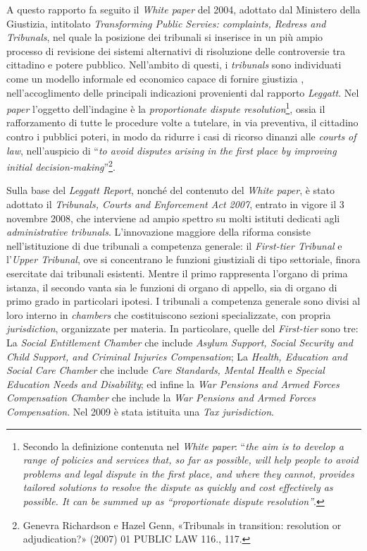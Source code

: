 \documentclass[12pt,it,a4paper,]{report}
\begin{document}
A questo rapporto fa seguito il \emph{White paper} del 2004, adottato
dal Ministero della Giustizia, intitolato \emph{Transforming Public
Servies: complaints, Redress and Tribunals}, nel quale la posizione dei
tribunali si inserisce in un più ampio processo di revisione dei sistemi
alternativi di risoluzione delle controversie tra cittadino e potere
pubblico. Nell'ambito di questi, i \emph{tribunals} sono individuati
come un modello informale ed economico capace di fornire giustizia ,
nell'accoglimento delle principali indicazioni provenienti dal rapporto
\emph{Leggatt}. Nel \emph{paper} l'oggetto dell'indagine è la
\emph{proportionate dispute resolution}\footnote{Secondo la definizione
  contenuta nel \emph{White paper}: ``\emph{the aim is to develop a
  range of policies and services that, so far as possible, will help
  people to avoid problems and legal dispute in the first place, and
  where they cannot, provides tailored solutions to resolve the dispute
  as quickly and cost effectively as possible. It can be summed up as
  ``proportionate dispute resolution''}.}, ossia il rafforzamento di
tutte le procedure volte a tutelare, in via preventiva, il cittadino
contro i pubblici poteri, in modo da ridurre i casi di ricorso dinanzi
alle \emph{courts of law}, nell'auspicio di ``\emph{to avoid disputes
arising in the first place by improving initial
decision-making}''\footnote{{Genevra Richardson e Hazel Genn,
  {«Tribunals in transition: resolution or adjudication?»} (2007) 01
  PUBLIC LAW 116.}, 117.}.

Sulla base del \emph{Leggatt Report}, nonché del contenuto del
\emph{White paper}, è stato adottato il \emph{Tribunals, Courts and
Enforcement Act 2007}, entrato in vigore il 3 novembre 2008, che
interviene ad ampio spettro su molti istituti dedicati agli
\emph{administrative tribunals}. L'innovazione maggiore della riforma
consiste nell'istituzione di due tribunali a competenza generale: il
\emph{First-tier Tribunal} e l'\emph{Upper Tribunal}, ove si concentrano
le funzioni giustiziali di tipo settoriale, finora esercitate dai
tribunali esistenti. Mentre il primo rappresenta l'organo di prima
istanza, il secondo vanta sia le funzioni di organo di appello, sia di
organo di primo grado in particolari ipotesi. I tribunali a competenza
generale sono divisi al loro interno in \emph{chambers} che
costituiscono sezioni specializzate, con propria \emph{jurisdiction},
organizzate per materia. In particolare, quelle del \emph{First-tier}
sono tre: La \emph{Social Entitlement Chamber} che include \emph{Asylum
Support, Social Security and Child Support, and Criminal Injuries
Compensation}; La \emph{Health, Education and Social Care Chamber} che
include \emph{Care Standards, Mental Health} e \emph{Special Education
Needs and Disability}; ed infine la \emph{War Pensions and Armed Forces
Compensation Chamber} che include la \emph{War Pensions and Armed Forces
Compensation}. Nel 2009 è stata istituita una \emph{Tax jurisdiction}.
\end{document}
